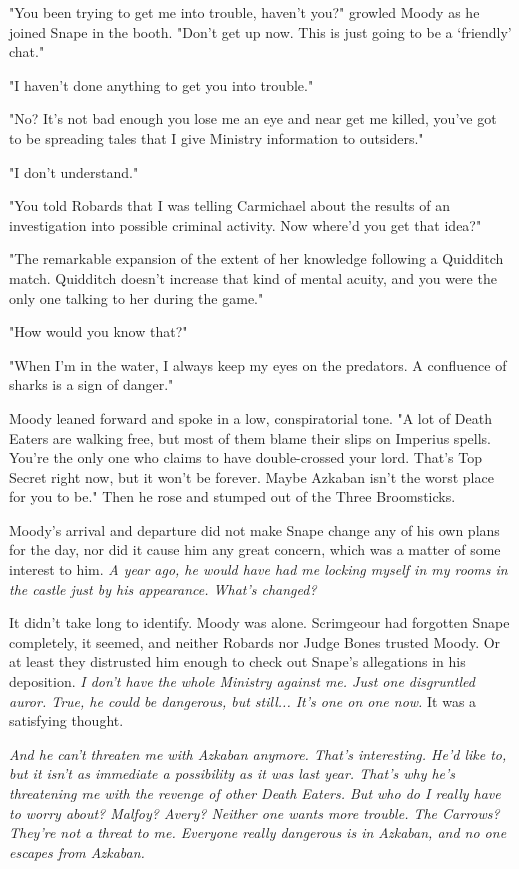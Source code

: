\documentclass[a4paper,11pt]{article}
\begin{document}
"You been trying to get me into trouble, haven't you?" growled Moody as he joined Snape in the booth. "Don't get up now. This is just going to be a `friendly' chat."

"I haven't done anything to get you into trouble."

"No? It's not bad enough you lose me an eye and near get me killed, you've got to be spreading tales that I give Ministry information to outsiders."

"I don't understand."

"You told Robards that I was telling Carmichael about the results of an investigation into possible criminal activity. Now where'd you get that idea?"

"The remarkable expansion of the extent of her knowledge following a Quidditch match. Quidditch doesn't increase that kind of mental acuity, and you were the only one talking to her during the game."

"How would you know that?"

"When I'm in the water, I always keep my eyes on the predators. A confluence of sharks is a sign of danger."

Moody leaned forward and spoke in a low, conspiratorial tone. "A lot of Death Eaters are walking free, but most of them blame their slips on Imperius spells. You're the only one who claims to have double-crossed your lord. That's Top Secret right now, but it won't be forever. Maybe Azkaban isn't the worst place for you to be." Then he rose and stumped out of the Three Broomsticks.

Moody's arrival and departure did not make Snape change any of his own plans for the day, nor did it cause him any great concern, which was a matter of some interest to him. \emph{A year ago, he would have had me locking myself in my rooms in the castle just by his appearance. What's changed?}

It didn't take long to identify. Moody was alone. Scrimgeour had forgotten Snape completely, it seemed, and neither Robards nor Judge Bones trusted Moody. Or at least they distrusted him enough to check out Snape's allegations in his deposition. \emph{I don't have the whole Ministry against me. Just one disgruntled auror. True, he could be dangerous, but still... It's one on one now.} It was a satisfying thought.

\emph{And he can't threaten me with Azkaban anymore. That's interesting. He'd like to, but it isn't as immediate a possibility as it was last year. That's why he's threatening me with the revenge of other Death Eaters. But who do I really have to worry about? Malfoy? Avery? Neither one wants more trouble. The Carrows? They're not a threat to me. Everyone really dangerous is in Azkaban, and no one escapes from Azkaban.}
\end{document}
